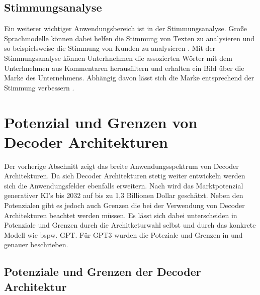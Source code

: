 \documentclass[conference]{IEEEtran}
\begin{document}
\subsection{Stimmungsanalyse}
Ein weiterer wichtiger Anwendungsbereich ist in der Stimmungsanalyse. Große Sprachmodelle können dabei helfen die Stimmung von Texten zu analysieren und so beispielsweise die Stimmung von Kunden zu analysieren \cite{keary12PraktischeLarge2023}. Mit der Stimmungsanalyse können Unterhnehmen die assozierten Wörter mit dem Unterhnehmen aus Kommentaren herausfiltern und erhalten ein Bild über die Marke des Unternehmens. Abhängig davon lässt sich die Marke entsprechend der Stimmung verbessern \cite{keary12PraktischeLarge2023}.

\section{Potenzial und Grenzen von Decoder Architekturen}
Der vorherige Abschnitt zeigt das breite Anwendungsspektrum von Decoder Architekturen. Da sich Decoder Architekturen stetig weiter entwickeln werden sich die Anwendungsfelder ebenfalls erweitern. Nach \cite{keary12PraktischeLarge2023} wird das Marktpotenzial generativer KI's bis 2032 auf bis zu 1,3 Billionen Dollar geschätzt. Neben den Potenzialen gibt es jedoch auch Grenzen die bei der Verwendung von Decoder Architekturen beachtet werden müssen. Es lässt sich dabei unterscheiden in Potenziale und Grenzen durch die Architketurwahl selbst und durch das konkrete Modell wie bspw. GPT.  Für GPT3 wurden die Poteziale und Grenzen in \cite{radfordLanguageModelsAre} und \cite{openaiGPT4TechnicalReport2024} genauer beschrieben.
\subsection{Potenziale und Grenzen der Decoder Architektur}
\end{document}
